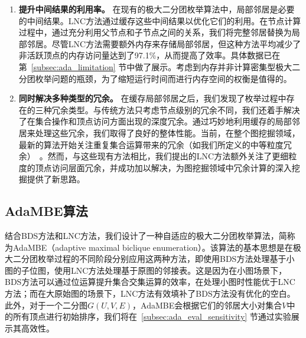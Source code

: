 \begin{enumerate}
  \item \textbf{提升中间结果的利用率。} 
  在现有的极大二分团枚举算法中，局部邻居是必要的中间结果。LNC方法通过缓存这些中间结果以优化它们的利用。在节点计算过程中，通过充分利用父节点和子节点之间的关系，我们将完整邻居替换为局部邻居。尽管LNC方法需要额外内存来存储局部邻居，但这种方法平均减少了非活跃顶点的内存访问量达到了97.1\%，从而提高了效率。具体数据已在第~\ref{subsec:ada_limitation} 节中做了展示。考虑到内存并非计算密集型极大二分团枚举问题的瓶颈，为了缩短运行时间而进行内存空间的权衡是值得的。

	\item \textbf{同时解决多种类型的冗余。} 
	在缓存局部邻居之后，我们发现了枚举过程中存在的三种冗余类型。与传统方法只考虑节点级别的冗余不同，我们还着手解决了在集合操作和顶点访问方面出现的深度冗余。通过巧妙地利用缓存的局部邻居来处理这些冗余，我们取得了良好的整体性能。当前，在整个图挖掘领域，最新的算法开始关注重复集合运算带来的冗余（如我们所定义的中等粒度冗余）~\cite{Graphpi20,GPMredundancy23}。然而，与这些现有方法相比，我们提出的LNC方法额外关注了更细粒度的顶点访问层面冗余，并成功加以解决，为图挖掘领域中冗余计算的深入挖掘提供了新思路。


\end{enumerate}

\subsection{AdaMBE算法}
\label{subsec:ada_design_all}

结合BDS方法和LNC方法，我们设计了一种自适应的极大二分团枚举算法，简称为AdaMBE（adaptive maximal biclique  enumeration）。该算法的基本思想是在极大二分团枚举过程的不同阶段分别应用这两种方法，即使用BDS方法处理基于小图的子位图，使用LNC方法处理基于原图的邻接表。这是因为在小图场景下，BDS方法可以通过位运算提升集合交集运算的效率，在处理小图时性能优于LNC方法；而在大原始图的场景下，LNC方法有效填补了BDS方法没有优化的空白。此外，对于一个二分图$G(U,V,E)$，AdaMBE会根据它们的邻居大小对集合$V$中的所有顶点进行初始排序，我们将在~\ref{subsec:ada_eval_sensitivity} 节通过实验展示其高效性。

